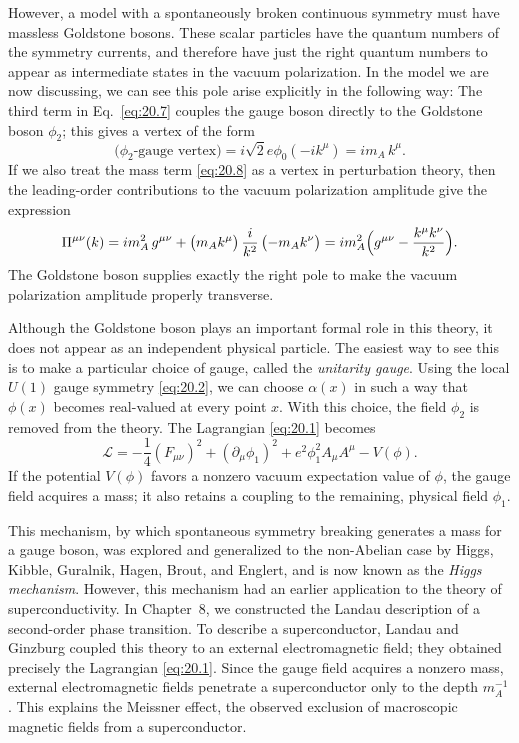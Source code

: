 However, a model with a spontaneously broken continuous symmetry must have
massless Goldstone bosons.  These scalar particles have the quantum numbers
of the symmetry currents, and therefore have just the right quantum numbers
to appear as intermediate states in the vacuum polarization.  In the model we
are now discussing, we can see this pole arise explicitly in the following way:
The third term in Eq.~\eqref{eq:20.7} couples the gauge boson directly to the
Goldstone boson $\phi_2$; this gives a vertex of the form
\begin{equation}
  \text{($\phi_2$-gauge vertex)} = i\sqrt{2}e\phi_0(-ik^\mu)
  = im_A\,k^\mu .
  \label{eq:20.10}
\end{equation}
If we also treat the mass term \eqref{eq:20.8} as a vertex in perturbation
theory, then the leading-order contributions to the vacuum polarization
amplitude give the expression
\begin{equation}
  \Pi^{\mu\nu}(k) = im_A^2\,g^{\mu\nu} + \bigl( m_A k^\mu \bigr)\,
    \frac{i}{k^2}\,\bigl( -m_A k^\nu \bigr)
  = im_A^2\Bigl( g^{\mu\nu} - \frac{k^\mu k^\nu}{k^2} \Bigr) .
  \label{eq:20.11}
\end{equation}
The Goldstone boson supplies exactly the right pole to make the vacuum
polarization amplitude properly transverse.

Although the Goldstone boson plays an important formal role in this theory,
it does not appear as an independent physical particle.  The easiest way to
see this is to make a particular choice of gauge, called the \emph{unitarity
gauge}.  Using the local $U(1)$ gauge symmetry \eqref{eq:20.2}, we can choose
$\alpha(x)$ in such a way that $\phi(x)$ becomes real-valued at every point
$x$.  With this choice, the field $\phi_2$ is removed from the theory.  The
Lagrangian \eqref{eq:20.1} becomes
\begin{equation}
  \mathcal{L} = -\frac{1}{4}(F_{\mu\nu})^2 + (\partial_\mu\phi_1)^2
    + e^2\phi_1^2A_\mu A^\mu - V(\phi) .
  \label{eq:20.12}
\end{equation}
If the potential $V(\phi)$ favors a nonzero vacuum expectation value of
$\phi$, the gauge field acquires a mass; it also retains a coupling to the
remaining, physical field $\phi_1$.

This mechanism, by which spontaneous symmetry breaking generates a mass for
a gauge boson, was explored and generalized to the non-Abelian case by Higgs,
Kibble, Guralnik, Hagen, Brout, and Englert, and is now known as the
\emph{Higgs mechanism}.  However, this mechanism had an earlier application
to the theory of superconductivity.  In Chapter~8, we constructed the Landau
description of a second-order phase transition.  To describe a superconductor,
Landau and Ginzburg coupled this theory to an external electromagnetic field;
they obtained precisely the Lagrangian \eqref{eq:20.1}.  Since the gauge field
acquires a nonzero mass, external electromagnetic fields penetrate a
superconductor only to the depth $m_A^{-1}$.  This explains the Meissner
effect, the observed exclusion of macroscopic magnetic fields from a
superconductor.

